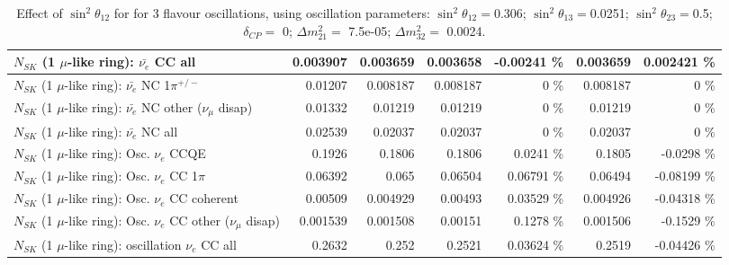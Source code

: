 \begin{table}
\begin{tabular}{| l | r | r | r  r | r  r |}
                            $N_{SK}$ (1 $\mu$-like ring): $\bar{\nu_{e}}$ CC all &        0.003907 &        0.003659 &        0.003658 & -0.00241 \%  &        0.003659 & 0.002421 \%  \\ 
\hline
                     $N_{SK}$ (1 $\mu$-like ring): $\bar{\nu_e}$ NC 1$\pi^{+/-}$ &         0.01207 &        0.008187 &        0.008187 &        0 \%  &        0.008187 &        0 \%  \\ 
          $N_{SK}$ (1 $\mu$-like ring): $\bar{\nu_e}$ NC other ($\nu_\mu$ disap) &         0.01332 &         0.01219 &         0.01219 &        0 \%  &         0.01219 &        0 \%  \\ 
                            $N_{SK}$ (1 $\mu$-like ring): $\bar{\nu_{e}}$ NC all &         0.02539 &         0.02037 &         0.02037 &        0 \%  &         0.02037 &        0 \%  \\ 
\hline
\hline
\hline
                                 $N_{SK}$ (1 $\mu$-like ring): Osc. $\nu_e$ CCQE &          0.1926 &          0.1806 &          0.1806 &   0.0241 \%  &          0.1805 &  -0.0298 \%  \\ 
                            $N_{SK}$ (1 $\mu$-like ring): Osc. $\nu_e$ CC 1$\pi$ &         0.06392 &           0.065 &         0.06504 &  0.06791 \%  &         0.06494 & -0.08199 \%  \\ 
                          $N_{SK}$ (1 $\mu$-like ring): Osc. $\nu_e$ CC coherent &         0.00509 &        0.004929 &         0.00493 &  0.03529 \%  &        0.004926 & -0.04318 \%  \\ 
           $N_{SK}$ (1 $\mu$-like ring): Osc. $\nu_e$ CC other ($\nu_\mu$ disap) &        0.001539 &        0.001508 &         0.00151 &   0.1278 \%  &        0.001506 &  -0.1529 \%  \\ 
                        $N_{SK}$ (1 $\mu$-like ring): oscillation $\nu_e$ CC all &          0.2632 &           0.252 &          0.2521 &  0.03624 \%  &          0.2519 & -0.04426 \%  \\ 
\hline
\hline
\end{tabular}
\caption{ Effect of $\sin^2\theta_{12}$ for for 3 flavour oscillations, using oscillation parameters:  $\sin^2\theta_{12} = $0.306; $\sin^2\theta_{13} = $0.0251; $\sin^2\theta_{23} = $0.5; $\delta_{CP} = $        0; $\Delta m^2_{21} = $    7.5e-05; $\Delta m^2_{32} = $    0.0024. }
\label{tab:num_mixing12_1RmuT_3f_osc_t13:0.0251}
\end{table}
\clearpage
